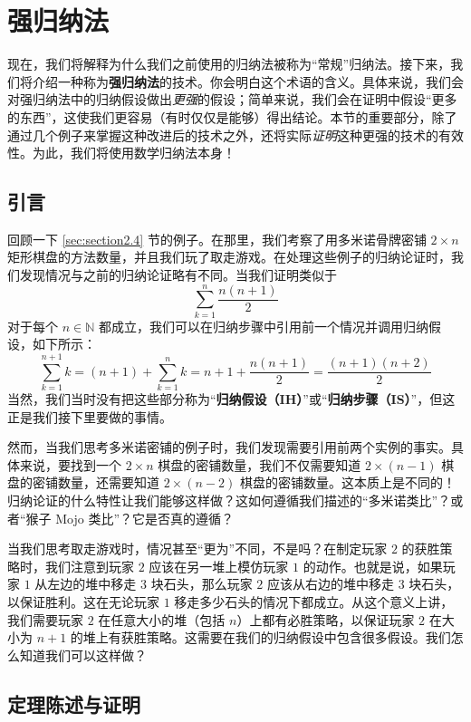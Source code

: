 \section{强归纳法}

现在，我们将解释为什么我们之前使用的归纳法被称为``常规''归纳法。接下来，我们将介绍一种称为\textbf{强归纳法}的技术。你会明白这个术语的含义。具体来说，我们会对强归纳法中的归纳假设做出\emph{更强}的假设；简单来说，我们会在证明中假设``更多的东西''，这使我们更容易（有时仅仅是能够）得出结论。本节的重要部分，除了通过几个例子来掌握这种改进后的技术之外，还将实际\emph{证明}这种更强的技术的有效性。为此，我们将使用数学归纳法本身！

\subsection{引言}

回顾一下 \ref{sec:section2.4} 节的例子。在那里，我们考察了用多米诺骨牌密铺 $2 \times n$ 矩形棋盘的方法数量，并且我们玩了取走游戏。在处理这些例子的归纳论证时，我们发现情况与之前的归纳论证略有不同。当我们证明类似于
\[\sum_{k=1}^{n} \frac{n(n+1)}{2}\]
对于每个 $n \in \mathbb{N}$ 都成立，我们可以在归纳步骤中引用前一个情况并调用归纳假设，如下所示：
\[\sum_{k=1}^{n+1} k=(n+1)+\sum_{k=1}^{n}k = n+1+\frac{n(n+1)}{2} = \frac{(n+1)(n+2)}{2} \]
当然，我们当时没有把这些部分称为``\textbf{归纳假设（IH）}''或``\textbf{归纳步骤（IS）}''，但这正是我们接下里要做的事情。

然而，当我们思考多米诺密铺的例子时，我们发现需要引用前两个实例的事实。具体来说，要找到一个 $2 \times n$ 棋盘的密铺数量，我们不仅需要知道 $2 \times (n-1)$ 棋盘的密铺数量，还需要知道 $2 \times (n-2)$ 棋盘的密铺数量。这本质上是不同的！归纳论证的什么特性让我们能够这样做？这如何遵循我们描述的``多米诺类比''？或者``猴子 Mojo 类比''？它是否真的遵循？

当我们思考取走游戏时，情况甚至``更为''不同，不是吗？在制定玩家 $2$ 的获胜策略时，我们注意到玩家 $2$ 应该在另一堆上模仿玩家 $1$ 的动作。也就是说，如果玩家 $1$ 从左边的堆中移走 $3$ 块石头，那么玩家 $2$ 应该从右边的堆中移走 $3$ 块石头，以保证胜利。这在无论玩家 $1$ 移走多少石头的情况下都成立。从这个意义上讲，我们需要玩家 $2$ 在任意大小的堆（包括 $n$）上都有必胜策略，以保证玩家 $2$ 在大小为 $n + 1$ 的堆上有获胜策略。这需要在我们的归纳假设中包含很多假设。我们怎么知道我们可以这样做？

\subsection{定理陈述与证明}\label{sec:section5.4.2}

